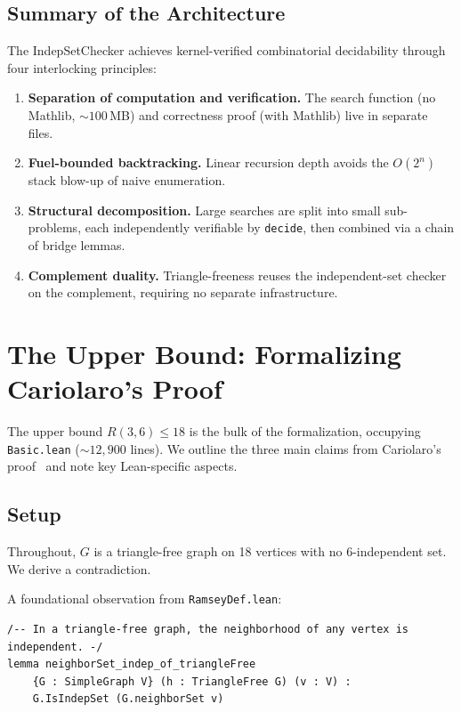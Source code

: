 \documentclass[11pt]{article}
\newcommand{\lean}[1]{\texttt{#1}}
\begin{document}
\subsection{Summary of the Architecture}

The IndepSetChecker achieves kernel-verified combinatorial decidability
through four interlocking principles:

\begin{enumerate}
\item \textbf{Separation of computation and verification.}
  The search function (no Mathlib, $\sim\!100$\,MB) and correctness proof
  (with Mathlib) live in separate files.

\item \textbf{Fuel-bounded backtracking.}
  Linear recursion depth avoids the $O(2^n)$ stack blow-up of naive
  enumeration.

\item \textbf{Structural decomposition.}
  Large searches are split into small sub-problems, each independently
  verifiable by \lean{decide}, then combined via a chain of bridge lemmas.

\item \textbf{Complement duality.}
  Triangle-freeness reuses the independent-set checker on the complement,
  requiring no separate infrastructure.
\end{enumerate}

\section{The Upper Bound: Formalizing Cariolaro's Proof}
\label{sec:upper}

The upper bound $R(3,6) \leq 18$ is the bulk of the formalization,
occupying \texttt{Basic.lean} ($\sim\!12{,}900$ lines).
We outline the three main claims from Cariolaro's proof~\cite{cariolaro1999}
and note key Lean-specific aspects.

\subsection{Setup}

Throughout, $G$ is a triangle-free graph on 18 vertices with no
6-independent set.
We derive a contradiction.

A foundational observation from \texttt{RamseyDef.lean}:

\begin{lstlisting}
/-- In a triangle-free graph, the neighborhood of any vertex is independent. -/
lemma neighborSet_indep_of_triangleFree
    {G : SimpleGraph V} (h : TriangleFree G) (v : V) :
    G.IsIndepSet (G.neighborSet v)
\end{lstlisting}
\end{document}
